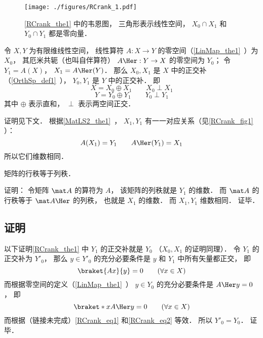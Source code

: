 

\begin{figure}[ht]
\centering
\texttt{[image: ./figures/RCrank\_1.pdf]}
\caption{\autoref{RCrank_the1} 中的韦恩图， 三角形表示线性空间， $X_0\cap X_1$ 和 $Y_0\cap  Y_1$ 都是零向量．} \label{RCrank_fig1}
\end{figure}

\begin{theorem}{}\label{RCrank_the1}
令 $X, Y$ 为有限维线性空间， 线性算符 $A:X \to Y$ 的零空间（\autoref{LinMap_the1}~）为 $X_0$， 其厄米共轭（也叫自伴算符） $A\Her: Y \to X$ 的零空间为 $Y_0$； 令 $Y_1 = A(X)$， $X_1 = A\Her(Y)$． 那么 $X_0, X_1$ 是 $X$ 中的正交补（\autoref{OrthSp_def1}~）， $Y_0, Y_1$ 是 $Y$ 中的正交补． 即
\begin{equation}
X = X_0 \oplus X_1 \qquad X_0 \perp X_1
\end{equation}
\begin{equation}
Y = Y_0 \oplus Y_1 \qquad Y_0 \perp Y_1
\end{equation}
其中 $\oplus$ 表示直和， $\perp$ 表示两空间正交．
\end{theorem}
证明见下文． 根据\autoref{MatLS2_the1}~， $X_1, Y_1$ 有一一对应关系（见\autoref{RCrank_fig1} ）：
\begin{equation}\label{RCrank_eq3}
A(X_1) = Y_1 \qquad A\Her (Y_1) = X_1
\end{equation}
所以它们维数相同．

\begin{corollary}{}
矩阵的行秩等于列秩．
\end{corollary}
证明： 令矩阵 $\mat A$ 的算符为 $A$， 该矩阵的列秩就是 $Y_1$ 的维数． 而 $\mat A$ 的行秩等于 $\mat A\Her$ 的列秩， 也就是 $X_1$ 的维数． 而 $X_1, Y_1$ 维数相同． 证毕．

\subsection{证明}
以下证明\autoref{RCrank_the1} 中 $Y_1$ 的正交补就是 $Y_0$ （$X_0, X_1$ 的证明同理）． 令 $Y_1$ 的正交补为 $Y'_0$， 那么 $y \in Y'_0$ 的充分必要条件是 $y$ 和 $Y_1$ 中所有矢量都正交， 即
\begin{equation}\label{RCrank_eq1}
\braket{Ax}{y} = 0 \qquad (\forall x \in X)
\end{equation}
而根据零空间的定义（\autoref{LinMap_the1}~） $y \in Y_0$ 的充分必要条件是 $A\Her y = 0$， 即
\begin{equation}\label{RCrank_eq2}
\braket*{x}{A\Her y} = 0 \qquad (\forall x \in X)
\end{equation}
而根据（链接未完成）\autoref{RCrank_eq1} 和\autoref{RCrank_eq2} 等效． 所以 $Y'_0 = Y_0$． 证毕．
